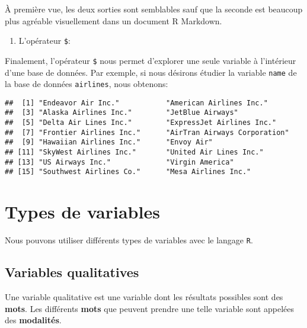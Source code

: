 \documentclass[]{book}
\newenvironment{Shaded}{\begin{snugshade}}{\end{snugshade}}
\newcommand{\OperatorTok}[1]{\textcolor[rgb]{0.81,0.36,0.00}{\textbf{#1}}}
\newcommand{\NormalTok}[1]{#1}
\providecommand{\tightlist}{%
  \setlength{\itemsep}{0pt}\setlength{\parskip}{0pt}}
\begin{document}
À première vue, les deux sorties sont semblables sauf que la seconde est
beaucoup plus agréable visuellement dans un document R Markdown.

\begin{enumerate}
\def\labelenumi{\arabic{enumi}.}
\setcounter{enumi}{3}
\tightlist
\item
  L'opérateur \texttt{\$}:
\end{enumerate}

Finalement, l'opérateur \texttt{\$} nous permet d'explorer une seule
variable à l'intérieur d'une base de données. Par exemple, si nous
désirons étudier la variable \texttt{name} de la base de données
\texttt{airlines}, nous obtenons:

\begin{Shaded}
\end{Shaded}

\begin{verbatim}
##  [1] "Endeavor Air Inc."           "American Airlines Inc."     
##  [3] "Alaska Airlines Inc."        "JetBlue Airways"            
##  [5] "Delta Air Lines Inc."        "ExpressJet Airlines Inc."   
##  [7] "Frontier Airlines Inc."      "AirTran Airways Corporation"
##  [9] "Hawaiian Airlines Inc."      "Envoy Air"                  
## [11] "SkyWest Airlines Inc."       "United Air Lines Inc."      
## [13] "US Airways Inc."             "Virgin America"             
## [15] "Southwest Airlines Co."      "Mesa Airlines Inc."
\end{verbatim}

\section{Types de variables}\label{types-de-variables}

Nous pouvons utiliser différents types de variables avec le langage
\texttt{R}.

\subsection{Variables qualitatives}\label{variables-qualitatives}

Une variable qualitative est une variable dont les résultats possibles
sont des \textbf{mots}. Les différents \textbf{mots} que peuvent prendre
une telle variable sont appelées des \textbf{modalités}.
\end{document}
